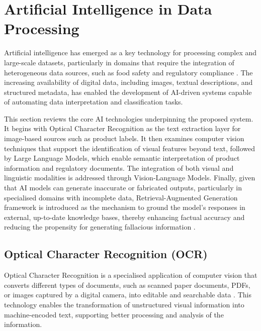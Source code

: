 \hypertarget{artificial-intelligence-in-data-processing}{%
\section{Artificial Intelligence in Data Processing}\label{artificial-intelligence-in-data-processing}}

Artificial intelligence has emerged as a key technology for processing complex and large-scale datasets, particularly in domains that require the integration of heterogeneous data sources, such as food safety and regulatory compliance \parencite{rawan_elragal_fb5fd9d1}. The increasing availability of digital data, including images, textual descriptions, and structured metadata, has enabled the development of AI-driven systems capable of automating data interpretation and classification tasks.

This section reviews the core AI technologies underpinning the proposed system. It begins with Optical Character Recognition as the text extraction layer for image-based sources such as product labels. It then examines computer vision techniques that support the identification of visual features beyond text, followed by Large Language Models, which enable semantic interpretation of product information and regulatory documents. The integration of both visual and linguistic modalities is addressed through Vision-Language Models. Finally, given that AI models can generate inaccurate or fabricated outputs, particularly in specialised domains with incomplete data, Retrieval-Augmented Generation framework is introduced as the mechanism to ground the model's responses in external, up-to-date knowledge bases, thereby enhancing factual accuracy and reducing the propensity for generating fallacious information \parencite{zahra_namkhah_66f512ba}.

\hypertarget{optical-character-recognition-ocr}{%
\subsection{Optical Character Recognition (OCR)}\label{optical-character-recognition-ocr}}

Optical Character Recognition is a specialised application of computer vision that converts different types of documents, such as scanned paper documents, PDFs, or images captured by a digital camera, into editable and searchable data \parencite{do_hee_kim_9624c3df}. This technology enables the transformation of unstructured visual information into machine-encoded text, supporting better processing and analysis of the information.

